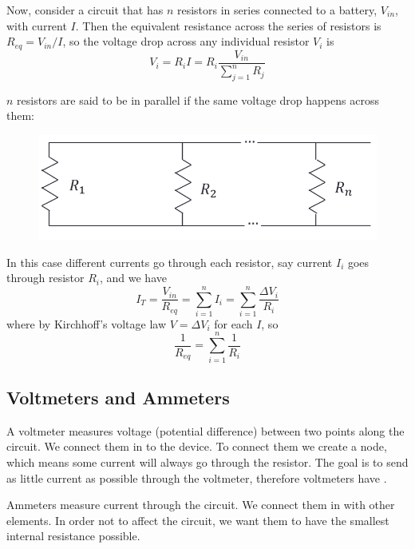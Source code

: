 Now, consider a circuit that has $n$ resistors in series connected to a battery, $V_{in}$, with current $I$. Then the equivalent resistance across the series of resistors is $R_{eq} = V_{in}/I$, so the voltage drop across any individual resistor $V_i$ is $$V_i = R_iI = R_i \frac{V_{in}}{\sum_{j=1}^nR_j}$$

\begin{defn}
    $n$ resistors are said to be in parallel if the same voltage drop happens across them:
    \begin{figure}[H]
        \centering
        \includegraphics[scale = 0.8]{Images/TH4.PNG}
    \end{figure}
    In this case different currents go through each resistor, say current $I_i$ goes through resistor $R_i$, and we have $$I_T = \frac{V_{in}}{R_{eq}} = \sum_{i=1}^nI_i = \sum_{i=1}^n\frac{\Delta V_i}{R_i}$$ where by Kirchhoff's voltage law $V = \Delta V_i$ for each $I$, so $$\frac{1}{R_{eq}} = \sum_{i=1}^n\frac{1}{R_i}$$
\end{defn}

\subsection{Voltmeters and Ammeters}

\begin{defn}
    A voltmeter measures voltage (potential difference) between two points along the circuit. We connect them in  to the device. To connect them we create a node, which means some current will always go through the resistor. The goal is to send as little current as possible through the voltmeter, therefore voltmeters have .
\end{defn}

\begin{defn}
    Ammeters measure current through the circuit. We connect them in  with other elements. In order not to affect the circuit, we want them to have the smallest internal resistance possible.
\end{defn}

